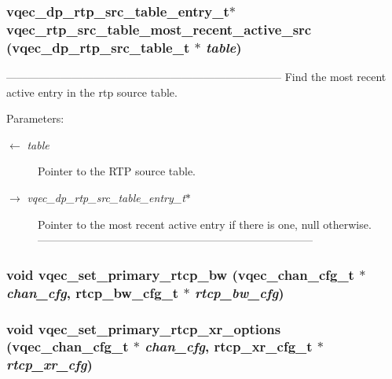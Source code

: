\subsubsection{\setlength{\rightskip}{0pt plus 5cm}vqec\_\-dp\_\-rtp\_\-src\_\-table\_\-entry\_\-t$\ast$ vqec\_\-rtp\_\-src\_\-table\_\-most\_\-recent\_\-active\_\-src (vqec\_\-dp\_\-rtp\_\-src\_\-table\_\-t $\ast$ {\em table})}\label{vqec__rtp_8h_b3ff3d8702bde7ce7e9651c3c05b16a1}


--------------------------------------------------------------------------- Find the most recent active entry in the rtp source table.

\begin{Desc}
\item[Parameters:]
\begin{description}
\item[\mbox{$\leftarrow$} {\em table}]Pointer to the RTP source table. \item[\mbox{$\rightarrow$} {\em vqec\_\-dp\_\-rtp\_\-src\_\-table\_\-entry\_\-t$\ast$}]Pointer to the most recent active entry if there is one, null otherwise. --------------------------------------------------------------------------- \end{description}
\end{Desc}
\subsubsection{\setlength{\rightskip}{0pt plus 5cm}void vqec\_\-set\_\-primary\_\-rtcp\_\-bw (\bf{vqec\_\-chan\_\-cfg\_\-t} $\ast$ {\em chan\_\-cfg}, rtcp\_\-bw\_\-cfg\_\-t $\ast$ {\em rtcp\_\-bw\_\-cfg})}\label{vqec__rtp_8h_f87f2016b6057f77a3d30323125ac09a}


\subsubsection{\setlength{\rightskip}{0pt plus 5cm}void vqec\_\-set\_\-primary\_\-rtcp\_\-xr\_\-options (\bf{vqec\_\-chan\_\-cfg\_\-t} $\ast$ {\em chan\_\-cfg}, rtcp\_\-xr\_\-cfg\_\-t $\ast$ {\em rtcp\_\-xr\_\-cfg})}\label{vqec__rtp_8h_6c9e4a2caf94b7c042087d478f95139d}


